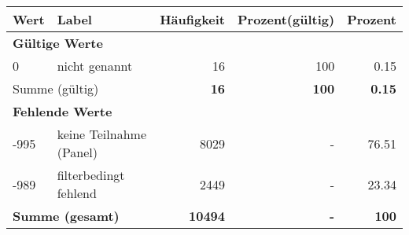      \begin{longtable}{lXrrr}
     \toprule
     \textbf{Wert} & \textbf{Label} & \textbf{Häufigkeit} & \textbf{Prozent(gültig)} & \textbf{Prozent} \\
     \endhead
     \midrule
     \multicolumn{5}{l}{\textbf{Gültige Werte}}\\

     0 &
     \multicolumn{1}{X}{ nicht genannt   } &


       \num{16} &
       \num[round-mode=places,round-precision=2]{100} &
         \num[round-mode=places,round-precision=2]{0,15} \\
     \midrule
     \multicolumn{2}{l}{Summe (gültig)} &
       \textbf{\num{16}} &
     \textbf{100} &
       \textbf{\num[round-mode=places,round-precision=2]{0,15}} \\
     \multicolumn{5}{l}{\textbf{Fehlende Werte}}\\
       -995 &
       keine Teilnahme (Panel) &
         \num{8029} &
        - &
         \num[round-mode=places,round-precision=2]{76,51} \\
       -989 &
       filterbedingt fehlend &
         \num{2449} &
        - &
         \num[round-mode=places,round-precision=2]{23,34} \\
     \midrule
     \multicolumn{2}{l}{\textbf{Summe (gesamt)}} &
          \textbf{\num{10494}} &
        \textbf{-} &
        \textbf{100} \\
     \bottomrule
     \end{longtable}
     
